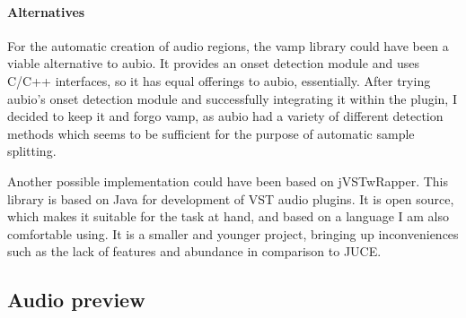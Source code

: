 \documentclass[12pt, a4paper, hidelinks]{article}
\begin{document}
	\paragraph{Alternatives\\}
	For the automatic creation of audio regions, the vamp\cite{vamp} library could have been a viable alternative to aubio\cite{aubio}. It provides an onset detection module\cite{vamponset} and uses C/C++ interfaces, so it has equal offerings to aubio, essentially. After trying aubio's onset detection module and successfully integrating it within the plugin, I decided to keep it and forgo vamp, as aubio had a variety of different detection methods which seems to be sufficient for the purpose of automatic sample splitting.\par	
	Another possible implementation could have been based on jVSTwRapper\cite{jVSTwRapper}. This library is based on Java for development of VST audio plugins. It is open source, which makes it suitable for the task at hand, and based on a language I am also comfortable using. It is a smaller and younger project, bringing up inconveniences such as the lack of features and abundance in comparison to JUCE. 
	
	
	\newpage	
	\subsection{Audio preview}
	
\end{document}
